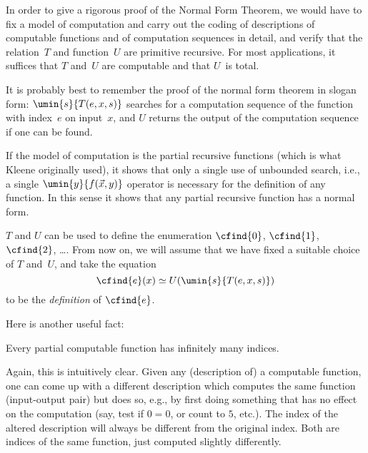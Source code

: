 \documentclass[../../../include/open-logic-section]{subfiles}
\begin{document}
\begin{explain}
In order to give a rigorous proof of the Normal Form Theorem, we would
have to fix a model of computation and carry out the coding of
descriptions of computable functions and of computation sequences in
detail, and verify that the relation~$T$ and function~$U$ are
primitive recursive.  For most applications, it suffices that $T$
and~$U$ are computable and that $U$~is total.

It is probably best to remember the proof of the normal form theorem
in slogan form: $\umin{s}{T(e, x, s)}$ searches for a computation
sequence of the function with index~$e$ on input~$x$, and $U$ returns
the output of the computation sequence if one can be found.
\end{explain}

If the model of computation is the partial recursive functions (which
is what Kleene originally used), it shows that only a single use of
unbounded search, i.e., a single $\umin{y}{f(\vec x, y)}$ operator is
necessary for the definition of any function. In this sense it shows
that any partial recursive function has a normal form.

$T$ and $U$ can be used to define the enumeration $\cfind{0}$,
$\cfind{1}$, $\cfind{2}$, \dots.  From now on, we will assume that we
have fixed a suitable choice of $T$ and~$U$, and take the equation
\[
\cfind{e}(x) \simeq U(\umin{s}{T(e,x,s)})
\]
to be the \emph{definition} of $\cfind{e}$.

Here is another useful fact:

\begin{thm}
Every partial computable function has infinitely many indices.
\end{thm}

Again, this is intuitively clear.  Given any (description of) a
computable function, one can come up with a different description
which computes the same function (input-output pair) but does so,
e.g., by first doing something that has no effect on the computation
(say, test if $0 = 0$, or count to $5$, etc.).  The index of the
altered description will always be different from the original
index.  Both are indices of the same function, just computed slightly
differently.
\end{document}
